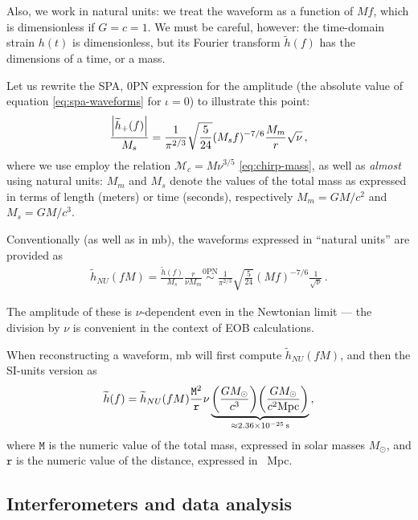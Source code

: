 \documentclass[main.tex]{subfiles}
\begin{document}
Also, we work in natural units: we treat the waveform as a function of \(Mf\), which is dimensionless if \(G = c = 1\).
We must be careful, however: the time-domain strain \(h(t)\) is dimensionless, but its Fourier transform \(\widetilde{h}(f)\) has the dimensions of a time, or a mass.

Let us rewrite the \ac{SPA}, 0PN expression for the amplitude (the absolute value of equation \ref{eq:spa-waveforms} for \(\iota = 0\)) to illustrate this point: 
%
\begin{align}
\frac{\abs{\widetilde{h}_+ (f)}}{M_s} = \frac{1}{\pi^{2/3}} \sqrt{ \frac{5}{24}}
(M_s f)^{-7/6} \frac{M_m}{r} \sqrt{\nu }
\,,
\end{align}
%
where we use employ the relation \(\mathcal{M}_c = M \nu^{3/5}\) \eqref{eq:chirp-mass}, as well as \emph{almost} using natural units: \(M_m\) and \(M_s\) denote the values of the total mass as expressed in terms of length (meters) or time (seconds), respectively \(M_m = GM / c^2\) and \(M_s = GM / c^3\).

Conventionally (as well as in \ac{mb}), the waveforms expressed in ``natural units'' are provided as 
%
\begin{align}
\widetilde{h}_{NU} (fM) = \frac{\widetilde{h}(f)}{M_s} \frac{r}{\nu M_m} \overset{\text{0PN}}{\sim} \frac{1}{\pi^{2/3}} \sqrt{ \frac{5}{24}} (Mf)^{-7/6} \frac{1}{\sqrt{ \nu }}
\,.
\end{align}

The amplitude of these is  \(\nu \)-dependent even in the Newtonian limit --- the division by \(\nu \) is convenient in the context of \ac{EOB} calculations. 

When reconstructing a waveform, \ac{mb} will first compute \(\widetilde{h}_{NU} (fM)\), and then the \ac{SI}-units version as 
%
\begin{align}
\widetilde{h}(f) 
= \widetilde{h}_{NU} (fM) \frac{\mathtt{M}^2}{\mathtt{r}} \nu 
\underbrace{\qty(\frac{G M_{\odot}}{c^3}) 
\qty(\frac{G M_{\odot}}{ c^2 \SI{}{Mpc} })}_{\approx \SI{2.36e-25}{s}}
\,,
\end{align}
%
where \(\mathtt{M}\) is the numeric value of the total mass, expressed in solar masses \(M_{\odot}\), and \(\mathtt{r}\) is the numeric value of the distance, expressed in \SI{}{Mpc}. 


\subsection{Interferometers and data analysis} \label{sec:data-analysis}
\end{document}
